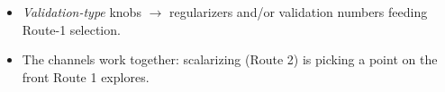 \begin{itemize}
    \item \emph{Validation-type} knobs $\to$ regularizers and/or validation numbers feeding Route-1 selection.
    \item The channels work together: scalarizing (Route 2) is picking a point on the front Route 1 explores. 

\end{itemize}
